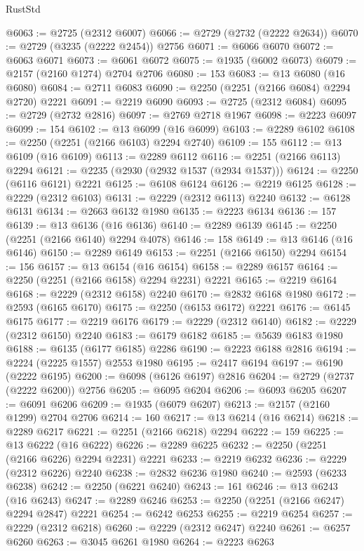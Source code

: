 \begin{lexlean}{RustStd}
\begin{coremodule}
@6063 := @2725 (@2312 @6007)
@6066 := @2729 (@2732 (@2222 @2634))
@6070 := @2729 (@3235 (@2222 @2454)) @2756
@6071 := @6066 @6070
@6072 := @6063 @6071
@6073 := @6061 @6072
@6075 := @1935 (@6002 @6073)
@6079 := @2157 (@2160 @1274) @2704 @2706
@6080 := 153
@6083 := @13 @6080 (@16 @6080)
@6084 := @2711 @6083
@6090 := @2250 (@2251 (@2166 @6084) @2294 @2720) @2221
@6091 := @2219 @6090
@6093 := @2725 (@2312 @6084)
@6095 := @2729 (@2732 @2816)
@6097 := @2769 @2718 @1967
@6098 := @2223 @6097
@6099 := 154
@6102 := @13 @6099 (@16 @6099)
@6103 := @2289 @6102
@6108 := @2250 (@2251 (@2166 @6103) @2294 @2740)
@6109 := 155
@6112 := @13 @6109 (@16 @6109)
@6113 := @2289 @6112
@6116 := @2251 (@2166 @6113) @2294
@6121 := @2235 (@2930 (@2932 @1537 (@2934 @1537)))
@6124 := @2250 (@6116 @6121) @2221
@6125 := @6108 @6124
@6126 := @2219 @6125
@6128 := @2229 (@2312 @6103)
@6131 := @2229 (@2312 @6113) @2240
@6132 := @6128 @6131
@6134 := @2663 @6132 @1980
@6135 := @2223 @6134
@6136 := 157
@6139 := @13 @6136 (@16 @6136)
@6140 := @2289 @6139
@6145 := @2250 (@2251 (@2166 @6140) @2294 @4078)
@6146 := 158
@6149 := @13 @6146 (@16 @6146)
@6150 := @2289 @6149
@6153 := @2251 (@2166 @6150) @2294
@6154 := 156
@6157 := @13 @6154 (@16 @6154)
@6158 := @2289 @6157
@6164 := @2250 (@2251 (@2166 @6158) @2294 @2231) @2221
@6165 := @2219 @6164
@6168 := @2229 (@2312 @6158) @2240
@6170 := @2832 @6168 @1980
@6172 := @2593 (@6165 @6170)
@6175 := @2250 (@6153 @6172) @2221
@6176 := @6145 @6175
@6177 := @2219 @6176
@6179 := @2229 (@2312 @6140)
@6182 := @2229 (@2312 @6150) @2240
@6183 := @6179 @6182
@6185 := @5639 @6183 @1980
@6188 := @6135 (@6177 @6185) @2286
@6190 := @2223 @6188 @2816
@6194 := @2224 (@2225 @1557) @2553 @1980
@6195 := @2417 @6194
@6197 := @6190 (@2222 @6195)
@6200 := @6098 (@6126 @6197) @2816
@6204 := @2729 (@2737 (@2222 @6200)) @2756
@6205 := @6095 @6204
@6206 := @6093 @6205
@6207 := @6091 @6206
@6209 := @1935 (@6079 @6207)
@6213 := @2157 (@2160 @1299) @2704 @2706
@6214 := 160
@6217 := @13 @6214 (@16 @6214)
@6218 := @2289 @6217
@6221 := @2251 (@2166 @6218) @2294
@6222 := 159
@6225 := @13 @6222 (@16 @6222)
@6226 := @2289 @6225
@6232 := @2250 (@2251 (@2166 @6226) @2294 @2231) @2221
@6233 := @2219 @6232
@6236 := @2229 (@2312 @6226) @2240
@6238 := @2832 @6236 @1980
@6240 := @2593 (@6233 @6238)
@6242 := @2250 (@6221 @6240)
@6243 := 161
@6246 := @13 @6243 (@16 @6243)
@6247 := @2289 @6246
@6253 := @2250 (@2251 (@2166 @6247) @2294 @2847) @2221
@6254 := @6242 @6253
@6255 := @2219 @6254
@6257 := @2229 (@2312 @6218)
@6260 := @2229 (@2312 @6247) @2240
@6261 := @6257 @6260
@6263 := @3045 @6261 @1980
@6264 := @2223 @6263

\end{coremodule}
\end{lexlean}
